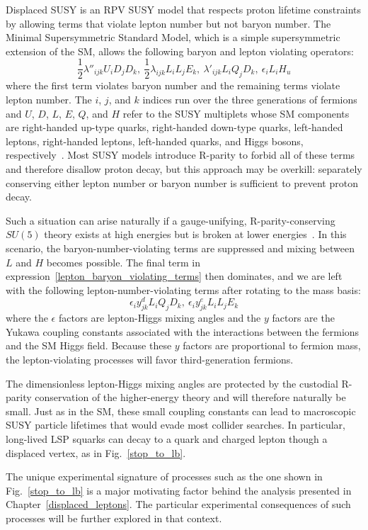 Displaced SUSY is an RPV SUSY model that respects proton lifetime constraints by allowing terms that violate lepton number but not baryon number. The Minimal Supersymmetric Standard Model, which is a simple supersymmetric extension of the SM, allows the following baryon and lepton violating operators:
\begin{equation}
    \label{lepton_baryon_violating_terms}
    \frac{1}{2}\lambda''_{ijk}U_{i}D_{j}D_{k},\ \frac{1}{2}\lambda_{ijk}L_{i}L_{j}E_{k},\  \lambda'_{ijk}L_{i}Q_{j}D_{k},\  \epsilon_{i}L_{i}H_{u} 
\end{equation}
where the first term violates baryon number and the remaining terms violate lepton number. The $i$, $j$, and $k$ indices run over the three generations of fermions and $U$, $D$, $L$, $E$, $Q$, and $H$ refer to the SUSY multiplets whose SM components are right-handed up-type quarks, right-handed down-type quarks, left-handed leptons, right-handed leptons, left-handed quarks, and Higgs bosons, respectively~\cite{susy_primer}. Most SUSY models introduce R-parity to forbid all of these terms and therefore disallow proton decay, but this approach may be overkill: separately conserving either lepton number or baryon number is sufficient to prevent proton decay.

Such a situation can arise naturally if a gauge-unifying, R-parity-conserving $SU(5)$ theory exists at high energies but is broken at lower energies~\cite{hall_suzuki_rpv}. In this scenario, the baryon-number-violating terms are suppressed and mixing between $L$ and $H$ becomes possible. The final term in expression~\eqref{lepton_baryon_violating_terms} then dominates, and we are left with the following lepton-number-violating terms after rotating to the mass basis:
\begin{equation}
    \label{displaced_susy_terms}
    \epsilon_{i}y^{d}_{jk}L_{i}Q_{j}D_{k},\ \epsilon_{i}y^{e}_{jk}L_{i}L_{j}E_{k} 
\end{equation}
where the $\epsilon$ factors are lepton-Higgs mixing angles and the $y$ factors are the Yukawa coupling constants associated with the interactions between the fermions and the SM Higgs field. Because these $y$ factors are proportional to fermion mass, the lepton-violating processes will favor third-generation fermions.

The dimensionless lepton-Higgs mixing angles are protected by the custodial R-parity conservation of the higher-energy theory and will therefore naturally be small. Just as in the SM, these small coupling constants can lead to macroscopic SUSY particle lifetimes that would evade most collider searches. In particular, long-lived LSP squarks can decay to a quark and charged lepton though a displaced vertex, as in Fig.~\ref{stop_to_lb}.



The unique experimental signature of processes such as the one shown in Fig.~\ref{stop_to_lb} is a major motivating factor behind the analysis presented in Chapter~\ref{displaced_leptons}. The particular experimental consequences of such processes will be further explored in that context.

\pagebreak